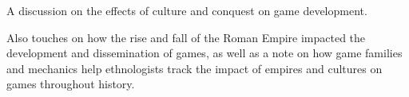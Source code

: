 A discussion on the effects of culture and conquest on game development.

Also touches on how the rise and fall of the Roman Empire impacted the development and dissemination of games,
as well as a note on how game families and mechanics help ethnologists track the impact of empires and cultures on games throughout history.

